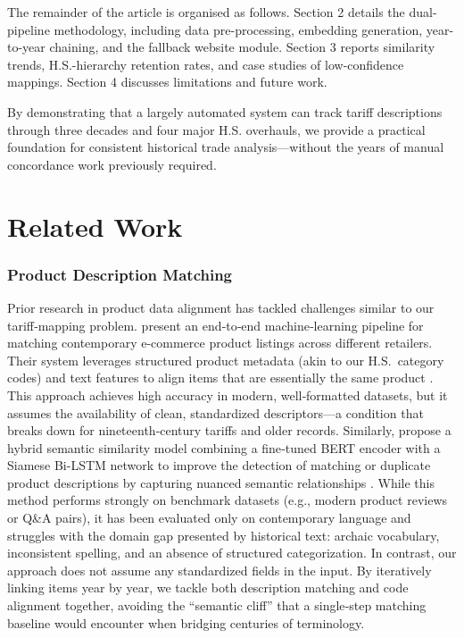 \documentclass[12pt]{article}
\begin{document}
The remainder of the article is organised as follows.
Section 2 details the dual-pipeline methodology, including data pre-processing, embedding generation, year-to-year chaining, and the fallback website module. Section 3 reports similarity trends, H.S.-hierarchy retention rates, and case studies of low-confidence mappings. Section 4 discusses limitations and future work.

By demonstrating that a largely automated system can track tariff descriptions through three decades and four major H.S. overhauls, we provide a practical foundation for consistent historical trade analysis—without the years of manual concordance work previously required.
\newpage

\section{Related Work}

\subsubsection*{Product Description Matching}  
Prior research in product data alignment has tackled challenges similar to our tariff‐mapping problem. \citeauthor{desantana23} present an end‐to‐end machine‐learning pipeline for matching contemporary e-commerce product listings across different retailers. Their system leverages structured product metadata (akin to our H.S.\ category codes) and text features to align items that are essentially the same product \cite{desantana23}. This approach achieves high accuracy in modern, well‐formatted datasets, but it assumes the availability of clean, standardized descriptors—a condition that breaks down for nineteenth‐century tariffs and older records. Similarly, \citeauthor{viji22} propose a hybrid semantic similarity model combining a fine‐tuned BERT encoder with a Siamese Bi-LSTM network to improve the detection of matching or duplicate product descriptions by capturing nuanced semantic relationships \cite{viji22}. While this method performs strongly on benchmark datasets (e.g., modern product reviews or Q\&A pairs), it has been evaluated only on contemporary language and struggles with the domain gap presented by historical text: archaic vocabulary, inconsistent spelling, and an absence of structured categorization. In contrast, our approach does not assume any standardized fields in the input. By iteratively linking items year by year, we tackle both description matching and code alignment together, avoiding the “semantic cliff” that a single‐step matching baseline would encounter when bridging centuries of terminology.
\end{document}
